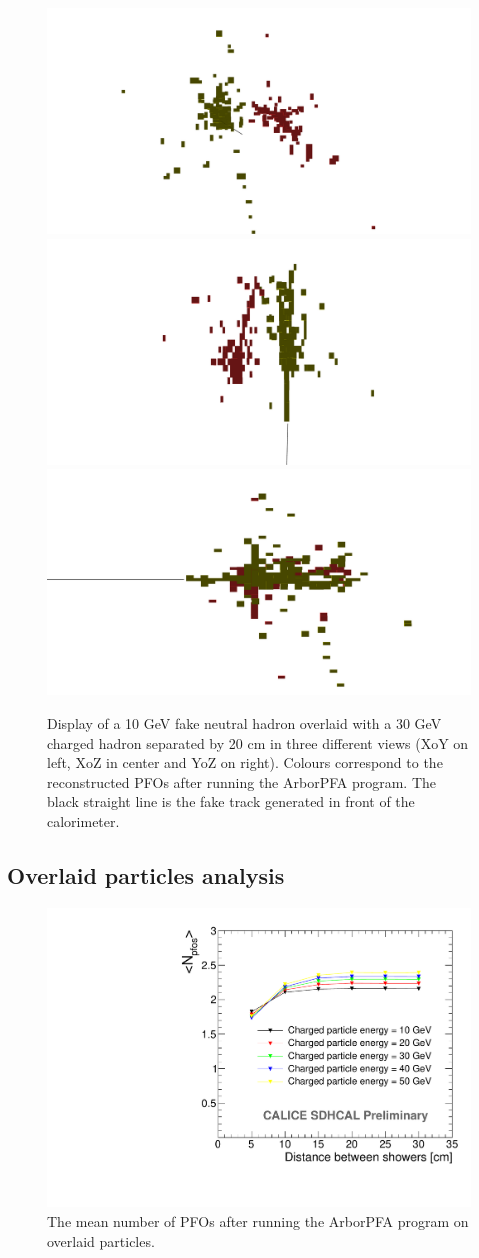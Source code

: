\documentclass[cits]{JINST}
\begin{document}
\begin{figure}[!h]
  \begin{center}
    \includegraphics[width=0.32\linewidth]{ArborPFA_PandoraMonitoring_SDHCAL_Overlay_XY.pdf}
    \includegraphics[width=0.32\linewidth]{ArborPFA_PandoraMonitoring_SDHCAL_Overlay_XZ.pdf}
    \includegraphics[width=0.32\linewidth]{ArborPFA_PandoraMonitoring_SDHCAL_Overlay_YZ.pdf}
  \end{center}
  \caption{\label{OVERLAY_EVENT_DISPLAY} Display of a 10 GeV fake neutral hadron overlaid with a 30 GeV charged hadron separated by 20 cm in three different views (XoY on left, XoZ in center and YoZ on right). Colours correspond to the reconstructed PFOs after running the ArborPFA program. The black straight line is the fake track generated in front of the calorimeter.}
\end{figure}

\subsection{Overlaid particles analysis}

\begin{figure}[!h]
  \begin{center}
    \includegraphics[width=0.6\linewidth]{plots/OverlayEvent_NPfos.pdf}
  \end{center}
  \caption{\label{OVERLAY_EVENT_NPFOS} The mean number of PFOs after running the ArborPFA program on overlaid particles.}
\end{figure}
\end{document}
